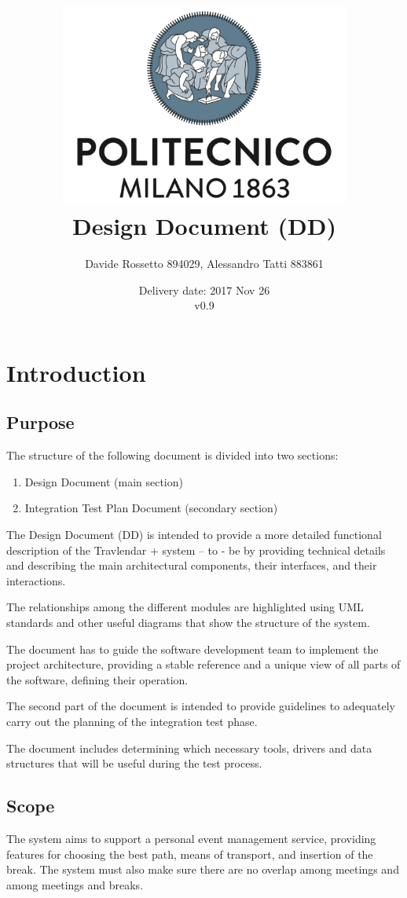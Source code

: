 \documentclass{article}
\title{ 
	\includegraphics[width=95mm]{img/PolimiLogo.png} \\
	\bigskip
	Design Document (DD)
}
\author{
	Davide Rossetto 894029, Alessandro Tatti 883861
}
\date{
	Delivery date: 2017 Nov 26\\
	\bigskip v0.9
}
\begin{document}
	
\maketitle
\newpage
\tableofcontents
\newpage
	
	
	\section{Introduction}
	

	\subsection{Purpose}
	The structure of the following document is divided into two sections:
	\begin{enumerate}
	\item Design Document (main section)
	\item Integration Test Plan Document (secondary section)
	\end{enumerate}

	\bigskip
	The Design Document (DD) is intended to provide a more detailed functional description of the Travlendar + system – to - be by providing technical details and describing the main architectural components, their interfaces, and their interactions.
	
	The relationships among the different modules are highlighted using UML standards and other useful diagrams that show the structure of the system.
	
	The document has to guide the software development team to implement the project architecture, providing a stable reference and a unique view of all parts of the software, defining their operation.

	\bigskip
	The second part of the document is intended to provide guidelines to adequately carry out the planning of the integration test phase.
	
	The document includes determining which necessary tools, drivers and data structures that will be useful during the test process.

	
	
	\subsection{Scope}
	The system aims to support a personal event management service, providing features for choosing the best path, means of transport, and insertion of the break. The system must also make sure there are no overlap among meetings and among meetings and breaks.
\end{document}
